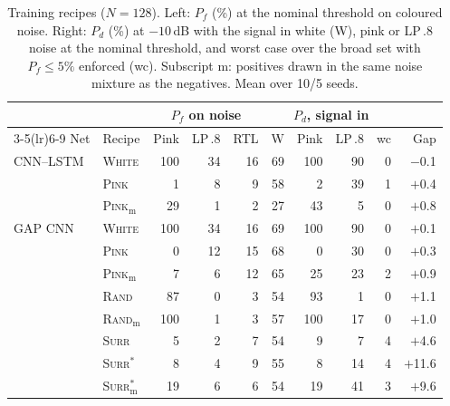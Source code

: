 \begin{table}[t]
\centering
\caption{Training recipes ($N=128$). Left: $P_f$ (\%) at the nominal threshold on coloured noise. Right: $P_d$ (\%) at $-10$\,dB with the signal in white (W), pink or LP\,.8 noise at the nominal threshold, and worst case over the broad set with $P_f\le5\%$ enforced (wc). Subscript m: positives drawn in the same noise mixture as the negatives. Mean over 10/5 seeds.}
\label{tab:recipes}
\footnotesize
\setlength{\tabcolsep}{2.3pt}
\begin{tabular}{llrrrrrrrr}
\toprule
& & \multicolumn{3}{c}{$P_f$ on noise} & \multicolumn{4}{c}{$P_d$, signal in} & \\
\cmidrule(lr){3-5}\cmidrule(lr){6-9}
Net & Recipe & Pink & LP\,.8 & RTL & W & Pink & LP\,.8 & wc & Gap \\
\midrule
CNN--LSTM & \textsc{White} & 100 & 34 & 16 & 69 & 100 & 90 & 0 & $-$0.1 \\
 & \textsc{Pink} & 1 & 8 & 9 & 58 & 2 & 39 & 1 & $+$0.4 \\
 & \textsc{Pink}$_{\mathrm{m}}$ & 29 & 1 & 2 & 27 & 43 & 5 & 0 & $+$0.8 \\
\midrule
GAP CNN & \textsc{White} & 100 & 34 & 16 & 69 & 100 & 90 & 0 & $+$0.1 \\
 & \textsc{Pink} & 0 & 12 & 15 & 68 & 0 & 30 & 0 & $+$0.3 \\
 & \textsc{Pink}$_{\mathrm{m}}$ & 7 & 6 & 12 & 65 & 25 & 23 & 2 & $+$0.9 \\
 & \textsc{Rand} & 87 & 0 & 3 & 54 & 93 & 1 & 0 & $+$1.1 \\
 & \textsc{Rand}$_{\mathrm{m}}$ & 100 & 1 & 3 & 57 & 100 & 17 & 0 & $+$1.0 \\
 & \textsc{Surr} & 5 & 2 & 7 & 54 & 9 & 7 & 4 & $+$4.6 \\
 & \textsc{Surr}$^{\ast}$ & 8 & 4 & 9 & 55 & 8 & 14 & 4 & $+$11.6 \\
 & \textsc{Surr}$^{\ast}_{\mathrm{m}}$ & 19 & 6 & 6 & 54 & 19 & 41 & 3 & $+$9.6 \\
\bottomrule
\end{tabular}
\end{table}

